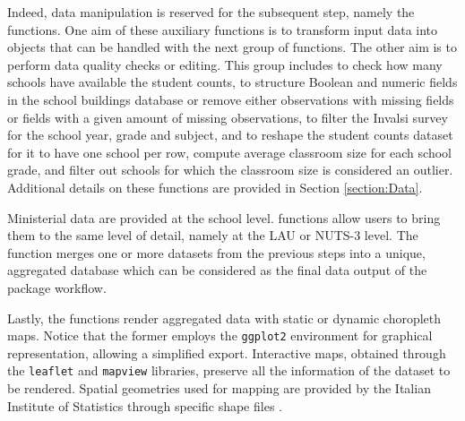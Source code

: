 \documentclass{book}
\begin{document}
Indeed, data manipulation is reserved for the subsequent step, namely the \texttt{} functions. One aim of these auxiliary functions is to transform input data into objects that can be handled with the next group of functions. The other aim is to perform data quality checks or editing. This group includes \texttt{} to check how many schools have available the student counts, \texttt{} to structure Boolean and numeric fields in the school buildings database or remove either observations with missing fields or fields with a given amount of missing observations, \texttt{} to filter the Invalsi survey for the school year, grade and subject, and \texttt{} to reshape the student counts dataset for it to have one school per row, compute average classroom size for each school grade, and filter out schools for which the classroom size is considered an outlier. Additional details on these functions are provided in Section \ref{section:Data}. 

Ministerial data are provided at the school level. \texttt{} functions allow users to bring them to the same level of detail, namely at the LAU or NUTS-3 level. The function \texttt{} merges one or more datasets from the previous steps into a unique, aggregated database which can be considered as the final data output of the package workflow.

Lastly, the \texttt{} functions render aggregated data with static or dynamic choropleth maps. Notice that the former employs the \texttt{ggplot2} \citep{ggplot} environment for graphical representation, allowing a simplified export. Interactive maps, obtained through the \texttt{leaflet} \citep{leaflet} and \texttt{mapview} \citep{mapview} libraries, preserve all the information of the dataset to be rendered. Spatial geometries used for mapping are provided by the Italian Institute of Statistics through specific shape files \citep{Shapefiles}.

 

\end{document}
